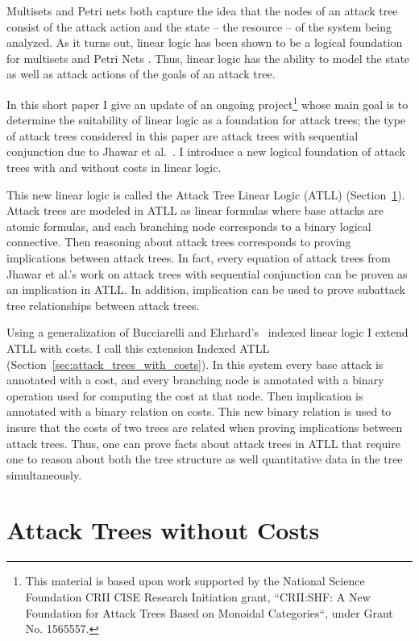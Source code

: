 \documentclass{llncs}
\begin{document}
Multisets and Petri nets both capture the idea that the nodes of an
attack tree consist of the attack action and the state -- the
resource -- of the system being analyzed. As it turns out, linear
logic has been shown to be a logical foundation for multisets
\cite{Tzouvaras:1998} and Petri Nets \cite{Brown:1991}.  Thus, linear
logic has the ability to model the state as well as attack actions of
the goals of an attack tree.  

In this short paper I give an update of an ongoing
project\footnote{This material is based upon work supported by the
  National Science Foundation CRII CISE Research Initiation grant,
  ``CRII:SHF: A New Foundation for Attack Trees Based on Monoidal
  Categories``, under Grant No. 1565557.} whose main goal is to
determine the suitability of linear logic as a foundation for attack
trees; the type of attack trees considered in this paper are attack
trees with sequential conjunction due to Jhawar et
al.~\cite{Jhawar:2015}.  I introduce a new logical foundation of
attack trees with and without costs in linear logic.

This new linear logic is called the Attack Tree Linear Logic (ATLL)
(Section~\ref{sec:attack_trees_without_costs}).  Attack trees are
modeled in ATLL as linear formulas where base attacks are atomic
formulas, and each branching node corresponds to a binary logical
connective. Then reasoning about attack trees corresponds to proving
implications between attack trees.  In fact, every equation of attack
trees from Jhawar et al.'s work on attack trees with sequential
conjunction \cite{Jhawar:2015} can be proven as an implication in
ATLL.  In addition, implication can be used to prove subattack tree
relationships between attack trees.

Using a generalization of Bucciarelli and Ehrhard’s~\cite{?} indexed
linear logic I extend ATLL with costs.  I call this extension Indexed
ATLL (Section~\ref{sec:attack_trees_with_costs}).  In this system
every base attack is annotated with a cost, and every branching node
is annotated with a binary operation used for computing the cost at
that node.  Then implication is annotated with a binary relation on
costs.  This new binary relation is used to insure that the costs of
two trees are related when proving implications between attack trees.
Thus, one can prove facts about attack trees in ATLL that require one
to reason about both the tree structure as well quantitative data in
the tree simultaneously.

\section{Attack Trees without Costs}
\label{sec:attack_trees_without_costs}

\end{document}
